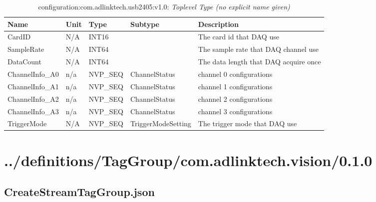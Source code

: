 \begin{table}[H]
\bigskip
\begin{tabularx}{\textwidth}{l l l l X} 
	 \textbf{Name} & \textbf{Unit} & \textbf{Type} & \textbf{Subtype} & \textbf{Description} \\
	 \midrule
   CardID & N/A & INT16 &  & The card id that DAQ use \\
   SampleRate & N/A & INT64 &  & The sample rate that DAQ channel use \\
   DataCount & N/A & INT64 &  & The data length that DAQ acquire once \\
   ChannelInfo\_A0 & n/a & NVP\_SEQ & ChannelStatus & channel 0 configurations \\
   ChannelInfo\_A1 & n/a & NVP\_SEQ & ChannelStatus & channel 1 configurations \\
   ChannelInfo\_A2 & n/a & NVP\_SEQ & ChannelStatus & channel 2 configurations \\
   ChannelInfo\_A3 & n/a & NVP\_SEQ & ChannelStatus & channel 3 configurations \\
   TriggerMode & N/A & NVP\_SEQ & TriggerModeSetting & The trigger mode that DAQ use \\
\end{tabularx}
\caption{configuration:com.adlinktech.usb2405:v1.0: \textit{Toplevel Type (no explicit name given)}}\label{DAQStateTagGroup.json:table:configuration-no-type-given}


\end{table}

\section{../definitions/TagGroup/com.adlinktech.vision/0.1.0}
\subsection{CreateStreamTagGroup.json}

